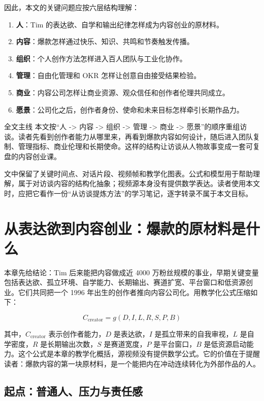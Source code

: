 \documentclass[a4paper]{article}
\begin{document}
因此，本文的关键问题应按六层结构理解：

\begin{enumerate}
  \item \textbf{人}：Tim 的表达欲、自学和输出纪律怎样成为内容创业的原材料。
  \item \textbf{内容}：爆款怎样通过快乐、知识、共鸣和节奏触发传播。
  \item \textbf{组织}：个人创作方法怎样进入百人团队与工业化协作。
  \item \textbf{管理}：自由化管理和 OKR 怎样让创意自由接受结果检验。
  \item \textbf{商业}：内容公司怎样让商业资源、观众信任和创作者伦理共同成立。
  \item \textbf{愿景}：公司化之后，创作者身份、使命和未来目标怎样牵引长期作品力。
\end{enumerate}

\begin{importantbox}{全文主线}
本文按“人 -> 内容 -> 组织 -> 管理 -> 商业 -> 愿景”的顺序重组访谈。读者先看到创作者能力从哪里来，再看到爆款内容如何设计，随后进入团队复制、管理指标、商业伦理和长期使命。这样的结构让访谈从人物故事变成一套可复盘的内容创业课。
\end{importantbox}

文中保留了关键时间点、对话片段、视频帧和教学化图表。公式和模型用于帮助理解，属于对访谈内容的结构化抽象；视频源本身没有提供数学表达。读者使用本文时，应把它看作一份“从访谈提炼方法”的学习笔记，逐字转录不属于本文目标。

\section{从表达欲到内容创业：爆款的原材料是什么}

本章先给结论：Tim 后来能把内容做成近 4000 万粉丝规模的事业，早期关键变量包括表达欲、孤立环境、自学能力、长期输出、赛道扩宽、平台窗口和低资源创业。它们共同把一个 1996 年出生的创作者推向内容公司化。用教学化公式压缩如下：

$$
C_{\text{creator}} = g(D, I, L, R, S, P, B)
$$

其中，$C_{\text{creator}}$ 表示创作者能力，$D$ 是表达欲，$I$ 是孤立带来的自我审视，$L$ 是自学密度，$R$ 是长期输出次数，$S$ 是赛道宽度，$P$ 是平台窗口，$B$ 是低资源启动能力。这个公式是本章的教学化概括，源视频没有提供数学公式。它的价值在于提醒读者：爆款内容的第一块原材料，是一个能把内在冲动连续转化为外部作品的人。

\subsection{起点：普通人、压力与责任感}
\end{document}
